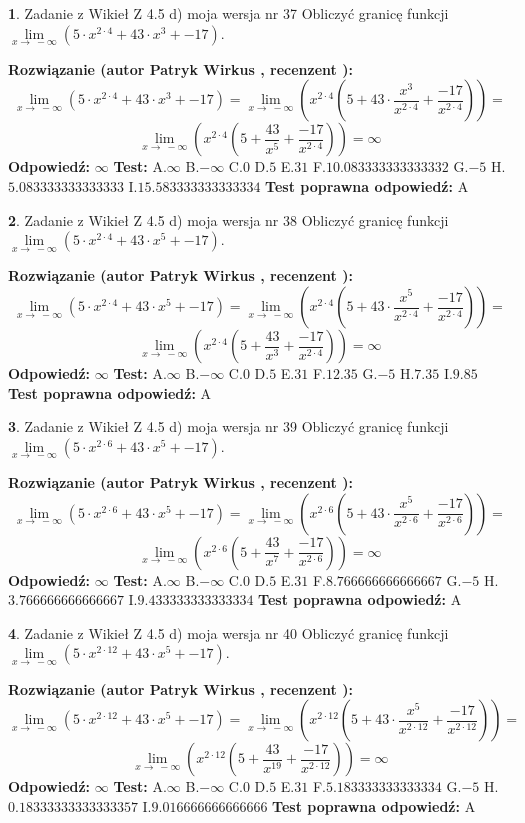 \documentclass[12pt, a4paper]{article}
\theoremstyle{definition} %
\newtheorem{zad}{}
\newcommand{\zadStart}[1]{\begin{zad}#1\newline}
\newcommand{\zadStop}{\end{zad}}
\newcommand{\rozwStart}[2]{\noindent \textbf{Rozwiązanie (autor #1 , recenzent #2): }\newline}
\newcommand{\rozwStop}{\newline}
\newcommand{\odpStart}{\noindent \textbf{Odpowiedź:}\newline}
\newcommand{\odpStop}{\newline}
\newcommand{\testStart}{\noindent \textbf{Test:}\newline}
\newcommand{\testStop}{\newline}
\newcommand{\kluczStart}{\noindent \textbf{Test poprawna odpowiedź:}\newline}
\newcommand{\kluczStop}{\newline}
\begin{document}
\zadStart{Zadanie z Wikieł Z 4.5 d) moja wersja nr 37}
Obliczyć granicę funkcji  $\lim\limits_{x\to\ -\infty}(5 \cdot x^{2\cdot4}+43 \cdot x^{3}+-17)$.
\zadStop
\rozwStart{Patryk Wirkus}{}
$$\lim\limits_{x\to\ -\infty}(5 \cdot x^{2\cdot4}+43 \cdot x^{3}+-17) = \lim\limits_{x\to\ -\infty}(x^{2\cdot4}(5 +43 \cdot \frac{x^{3}}{x^{2\cdot4}}+\frac{-17}{x^{2\cdot4}})) =$$ $$\lim\limits_{x\to\ -\infty}(x^{2\cdot4}(5 +\frac{43}{x^{5}}+\frac{-17}{x^{2\cdot4}})) =\infty$$
\rozwStop
\odpStart
$\infty$
\odpStop
\testStart
A.$\infty$ B.$-\infty$ C.$0$ D.$5$ E.$31$
F.$10.083333333333332$ G.$-5$
H.$5.083333333333333$
I.$15.583333333333334$
\testStop
\kluczStart
A
\kluczStop



\zadStart{Zadanie z Wikieł Z 4.5 d) moja wersja nr 38}
Obliczyć granicę funkcji  $\lim\limits_{x\to\ -\infty}(5 \cdot x^{2\cdot4}+43 \cdot x^{5}+-17)$.
\zadStop
\rozwStart{Patryk Wirkus}{}
$$\lim\limits_{x\to\ -\infty}(5 \cdot x^{2\cdot4}+43 \cdot x^{5}+-17) = \lim\limits_{x\to\ -\infty}(x^{2\cdot4}(5 +43 \cdot \frac{x^{5}}{x^{2\cdot4}}+\frac{-17}{x^{2\cdot4}})) =$$ $$\lim\limits_{x\to\ -\infty}(x^{2\cdot4}(5 +\frac{43}{x^{3}}+\frac{-17}{x^{2\cdot4}})) =\infty$$
\rozwStop
\odpStart
$\infty$
\odpStop
\testStart
A.$\infty$ B.$-\infty$ C.$0$ D.$5$ E.$31$
F.$12.35$ G.$-5$
H.$7.35$
I.$9.85$
\testStop
\kluczStart
A
\kluczStop



\zadStart{Zadanie z Wikieł Z 4.5 d) moja wersja nr 39}
Obliczyć granicę funkcji  $\lim\limits_{x\to\ -\infty}(5 \cdot x^{2\cdot6}+43 \cdot x^{5}+-17)$.
\zadStop
\rozwStart{Patryk Wirkus}{}
$$\lim\limits_{x\to\ -\infty}(5 \cdot x^{2\cdot6}+43 \cdot x^{5}+-17) = \lim\limits_{x\to\ -\infty}(x^{2\cdot6}(5 +43 \cdot \frac{x^{5}}{x^{2\cdot6}}+\frac{-17}{x^{2\cdot6}})) =$$ $$\lim\limits_{x\to\ -\infty}(x^{2\cdot6}(5 +\frac{43}{x^{7}}+\frac{-17}{x^{2\cdot6}})) =\infty$$
\rozwStop
\odpStart
$\infty$
\odpStop
\testStart
A.$\infty$ B.$-\infty$ C.$0$ D.$5$ E.$31$
F.$8.766666666666667$ G.$-5$
H.$3.766666666666667$
I.$9.433333333333334$
\testStop
\kluczStart
A
\kluczStop



\zadStart{Zadanie z Wikieł Z 4.5 d) moja wersja nr 40}
Obliczyć granicę funkcji  $\lim\limits_{x\to\ -\infty}(5 \cdot x^{2\cdot12}+43 \cdot x^{5}+-17)$.
\zadStop
\rozwStart{Patryk Wirkus}{}
$$\lim\limits_{x\to\ -\infty}(5 \cdot x^{2\cdot12}+43 \cdot x^{5}+-17) = \lim\limits_{x\to\ -\infty}(x^{2\cdot12}(5 +43 \cdot \frac{x^{5}}{x^{2\cdot12}}+\frac{-17}{x^{2\cdot12}})) =$$ $$\lim\limits_{x\to\ -\infty}(x^{2\cdot12}(5 +\frac{43}{x^{19}}+\frac{-17}{x^{2\cdot12}})) =\infty$$
\rozwStop
\odpStart
$\infty$
\odpStop
\testStart
A.$\infty$ B.$-\infty$ C.$0$ D.$5$ E.$31$
F.$5.183333333333334$ G.$-5$
H.$0.18333333333333357$
I.$9.016666666666666$
\testStop
\kluczStart
A
\kluczStop
\end{document}
